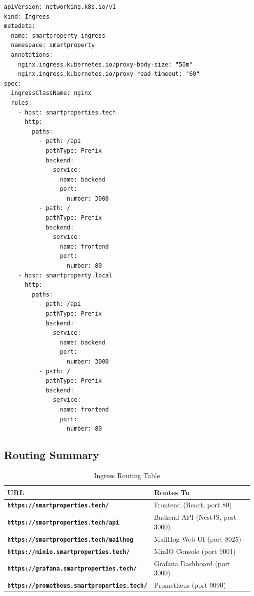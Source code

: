 \documentclass[12pt,a4paper]{report}
\begin{document}
\begin{lstlisting}[style=yamlstyle, caption={SmartProperty Ingress Configuration}]
apiVersion: networking.k8s.io/v1
kind: Ingress
metadata:
  name: smartproperty-ingress
  namespace: smartproperty
  annotations:
    nginx.ingress.kubernetes.io/proxy-body-size: "50m"
    nginx.ingress.kubernetes.io/proxy-read-timeout: "60"
spec:
  ingressClassName: nginx
  rules:
    - host: smartproperties.tech
      http:
        paths:
          - path: /api
            pathType: Prefix
            backend:
              service:
                name: backend
                port:
                  number: 3000
          - path: /
            pathType: Prefix
            backend:
              service:
                name: frontend
                port:
                  number: 80
    - host: smartproperty.local
      http:
        paths:
          - path: /api
            pathType: Prefix
            backend:
              service:
                name: backend
                port:
                  number: 3000
          - path: /
            pathType: Prefix
            backend:
              service:
                name: frontend
                port:
                  number: 80
\end{lstlisting}

\subsection{Routing Summary}

\begin{table}[H]
  \centering
  \begin{tabular}{>{\bfseries}p{6cm} p{7cm}}
    \toprule
    \textbf{URL} & \textbf{Routes To} \\
    \midrule
    \texttt{https://smartproperties.tech/} & Frontend (React, port 80) \\
    \texttt{https://smartproperties.tech/api} & Backend API (NestJS, port 3000) \\
    \texttt{https://smartproperties.tech/mailhog} & MailHog Web UI (port 8025) \\
    \texttt{https://minio.smartproperties.tech/} & MinIO Console (port 9001) \\
    \texttt{https://grafana.smartproperties.tech/} & Grafana Dashboard (port 3000) \\
    \texttt{https://prometheus.smartproperties.tech/} & Prometheus (port 9090) \\
    \bottomrule
  \end{tabular}
  \caption{Ingress Routing Table}
\end{table}
\end{document}
